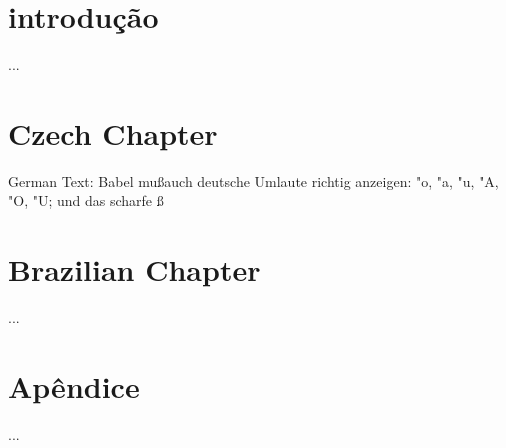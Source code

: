 \documentclass[a4paper]{book}
\begin{document}
\frontmatter
\chapter{introdução}
...
\mainmatter
{}
\chapter{Czech Chapter}

\foreignlanguage{german}{German Text: Babel mu\ss auch deutsche Umlaute richtig
anzeigen: "o, "a, "u, "A, "O, "U; und das scharfe \ss}

\chapter{Brazilian Chapter}
...
\appendix
\chapter{Apêndice}
...
\end{document}
